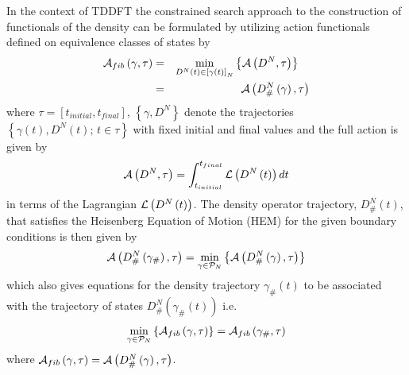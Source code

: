 In the context of TDDFT the constrained search approach to the construction
of functionals of the density can be formulated by utilizing action
functionals defined on equivalence classes of states by 
\begin{eqnarray}
{\cal A}_{fib}\left( \gamma ,\tau \right) &=&\min_{D^{N}\left( t\right) \in %
\left[ \gamma \left( t\right) \right] _{N}}\left\{ {\cal A}\left( D^{N},\tau
\right) \right\} \quad  \nonumber \\
&=&{\cal A}\left( D_{\#}^{N}\left( \gamma \right) ,\tau \right)
\label{restact}
\end{eqnarray}%
where $\tau =\left[ t_{initial},t_{final}\right] $, $\left\{ \gamma
,D^{N}\right\} $ denote the trajectories $\left\{ \gamma \left( t\right)
,D^{N}\left( t\right) ;\,t\in \tau \right\} $ with fixed initial and final
values and the full action is given by 
\begin{equation}
{\cal A}\left( D^{N},\tau \right) =\int_{t_{initial}}^{t_{final}}{\cal L}%
\left( D^{N}\left( t\right) \right) dt
\end{equation}%
in terms of the Lagrangian ${\cal L}\left( D^{N}\left( t\right) \right) $.
The density operator trajectory, $D_{\#}^{N}\left( t\right) $, that
satisfies the Heisenberg Equation of Motion (HEM) for the given boundary
conditions is then given by 
\begin{equation}
{\cal A}\left( D_{\#}^{N}\left( \gamma _{\#}\right) ,\tau \right)
=\min_{\gamma \in {\cal P}_{N}}\left\{ {\cal A}\left( D_{\#}^{N}\left(
\gamma \right) ,\tau \right) \right\}
\end{equation}%
which also gives equations for the density trajectory $\gamma _{\#}\left(
t\right) $ to be associated with the trajectory of states $D_{\#}^{N}\left(
\gamma _{\#}\left( t\right) \right) $ i.e. 
\begin{equation}
\min_{\gamma \in {\cal P}_{N}}\left\{ {\cal A}_{fib}\left( \gamma ,\tau
\right) \right\} ={\cal A}_{fib}\left( \gamma _{\#},\tau \right)
\end{equation}%
where ${\cal A}_{fib}\left( \gamma ,\tau \right) ={\cal A}\left(
D_{\#}^{N}\left( \gamma \right) ,\tau \right) $.

